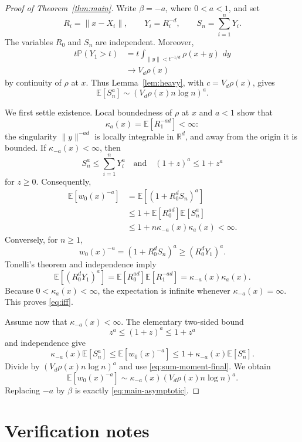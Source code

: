 \documentclass[11pt]{article}
\newcommand{\E}{\mathbb E}
\newcommand{\Pp}{\mathbb P}
\newcommand{\R}{\mathbb R}
\newcommand{\dd}{\,d}
\begin{document}
\begin{proof}[Proof of Theorem~\ref{thm:main}]
Write $\beta=-a$, where $0<a<1$, and set
\[
 R_i=\|x-X_i\|,\qquad Y_i=R_i^{-d},\qquad
 S_n=\sum_{i=1}^nY_i.
\]
The variables $R_0$ and $S_n$ are independent.  Moreover,
\begin{align*}
 t\Pp(Y_1>t)
 &=t\int_{\|y\|<t^{-1/d}}\rho(x+y)\,\dd y\\
 &\longrightarrow V_d\rho(x)
\end{align*}
by continuity of $\rho$ at $x$.  Thus Lemma~\ref{lem:heavy}, with
$c=V_d\rho(x)$, gives
\begin{equation}\label{eq:sum-moment-final}
 \E[S_n^a]\sim(V_d\rho(x)n\log n)^a.
\end{equation}

We first settle existence.  Local boundedness of $\rho$ at $x$ and
$a<1$ show that
\[
 \kappa_a(x)=\E[R_1^{-ad}]<\infty:
\]
the singularity $\|y\|^{-ad}$ is locally integrable in $\R^d$, and away
from the origin it is bounded.  If $\kappa_{-a}(x)<\infty$, then
\[
 S_n^a\leq\sum_{i=1}^nY_i^a
\quad\text{and}\quad
 (1+z)^a\leq1+z^a
\]
for $z\geq0$.  Consequently,
\begin{align*}
 \E[w_0(x)^{-a}]
 &=\E[(1+R_0^dS_n)^a]\\
 &\leq1+\E[R_0^{ad}]\E[S_n^a]\\
 &\leq1+n\kappa_{-a}(x)\kappa_a(x)<\infty.
\end{align*}
Conversely, for $n\geq1$,
\[
 w_0(x)^{-a}
 =(1+R_0^dS_n)^a
 \geq(R_0^dY_1)^a.
\]
Tonelli's theorem and independence imply
\[
 \E[(R_0^dY_1)^a]
 =\E[R_0^{ad}]\E[R_1^{-ad}]
 =\kappa_{-a}(x)\kappa_a(x).
\]
Because $0<\kappa_a(x)<\infty$, the expectation is infinite whenever
$\kappa_{-a}(x)=\infty$.  This proves \eqref{eq:iff}.

Assume now that $\kappa_{-a}(x)<\infty$.  The elementary two-sided bound
\[
 z^a\leq(1+z)^a\leq1+z^a
\]
and independence give
\[
 \kappa_{-a}(x)\E[S_n^a]
 \leq\E[w_0(x)^{-a}]
 \leq1+\kappa_{-a}(x)\E[S_n^a].
\]
Divide by $(V_d\rho(x)n\log n)^a$ and use
\eqref{eq:sum-moment-final}.  We obtain
\[
 \E[w_0(x)^{-a}]
 \sim\kappa_{-a}(x)(V_d\rho(x)n\log n)^a.
\]
Replacing $-a$ by $\beta$ is exactly
\eqref{eq:main-asymptotic}.
\end{proof}

\section{Verification notes}
\end{document}
